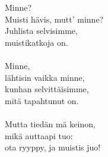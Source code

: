 
            Minne? \\
            Muisti hävis, mutt’ minne? \\
            Juhlista selvisimme, \\
            muistikatkoja on. \\
\hspace{10mm} \\
            Minne, \\
            lähtisin vaikka minne, \\
            kunhan selvittäisimme, \\
            mitä tapahtunut on. \\
\hspace{10mm} \\
            Mutta tiedän mä keinon, \\
            mikä auttaapi tuo: \\
            ota ryyppy, ja muistis juo! \\
